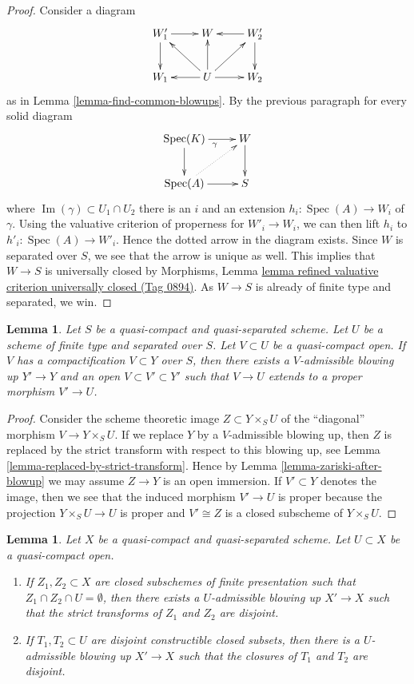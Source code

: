 \documentclass{amsart}
\theoremstyle{plain}
\newtheorem{lemma}[subsection]{Lemma}
\theoremstyle{definition}
\theoremstyle{remark}
\numberwithin{equation}{subsection}
\def\Spec{\mathop{\mathrm{Spec}}}
\def\Im{\mathop{\mathrm{Im}}}
\begin{document}
\begin{proof}
\medskip\noindent
Consider a diagram
$$
\xymatrix{
W_1' \ar[d] \ar[r] & W & W_2' \ar[l] \ar[d] \\
W_1 & U \ar[l] \ar[lu] \ar[u] \ar[ru] \ar[r] & W_2
}
$$
as in Lemma \ref{lemma-find-common-blowups}. By the previous paragraph
for every solid diagram
$$
\xymatrix{
\Spec(K) \ar[r]_\gamma  \ar[d] & W \ar[d] \\
\Spec(A) \ar@{..>}[ru] \ar[r] & S
}
$$
where $\Im(\gamma) \subset U_1 \cap U_2$ there is an $i$ and
an extension $h_i : \Spec(A) \to W_i$ of $\gamma$.
Using the valuative criterion of properness for $W'_i \to W_i$,
we can then lift $h_i$ to $h'_i : \Spec(A) \to W'_i$.
Hence the dotted arrow in the diagram exists. Since $W$
is separated over $S$, we see that the arrow is unique as well.
This implies that $W \to S$ is universally closed by
Morphisms, Lemma
\href{https://stacks.math.columbia.edu/tag/0894}{lemma refined valuative criterion universally closed (Tag 0894)}.
As $W \to S$ is already of finite type and separated, we win.
\end{proof}


\begin{lemma}
\label{lemma-compactification-dominates}
Let $S$ be a quasi-compact and quasi-separated scheme. Let $U$ be a
scheme of finite type and separated over $S$. Let $V \subset U$ be a
quasi-compact open. If $V$ has a compactification $V \subset Y$
over $S$, then there exists a $V$-admissible blowing up $Y' \to Y$ and an
open $V \subset V' \subset Y'$ such that $V \to U$
extends to a proper morphism $V' \to U$.
\end{lemma}

\begin{proof}
Consider the scheme theoretic image $Z \subset Y \times_S U$
of the ``diagonal'' morphism $V \to Y \times_S U$. If we replace
$Y$ by a $V$-admissible blowing up, then $Z$ is replaced by
the strict transform with respect to this blowing up, see
Lemma \ref{lemma-replaced-by-strict-transform}. Hence by
Lemma \ref{lemma-zariski-after-blowup} we may assume $Z \to Y$
is an open immersion. If $V' \subset Y$ denotes the image, then we
see that the induced morphism $V' \to U$ is proper because the
projection $Y \times_S U \to U$ is proper and $V' \cong Z$
is a closed subscheme of $Y \times_S U$.
\end{proof}


\begin{lemma}
\label{lemma-separate-disjoint-locally-closed-by-blowing-up}
Let $X$ be a quasi-compact and quasi-separated scheme.
Let $U \subset X$ be a quasi-compact open.
\begin{enumerate}
\item If $Z_1, Z_2 \subset X$ are closed subschemes of finite
presentation such that $Z_1 \cap Z_2 \cap U = \emptyset$, then
there exists a $U$-admissible blowing up $X' \to X$
such that the strict transforms of $Z_1$ and $Z_2$ are disjoint.
\item If $T_1, T_2 \subset U$ are disjoint constructible closed subsets, then
there is a $U$-admissible blowing up $X' \to X$ such that the closures of
$T_1$ and $T_2$ are disjoint.
\end{enumerate}
\end{lemma}
\end{document}
